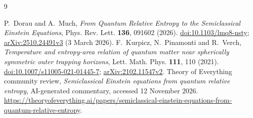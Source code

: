 \documentclass[11pt]{article}
\begin{document}
\begin{thebibliography}{9}
\raggedright
{} P.~Dorau and A.~Much,
\emph{From Quantum Relative Entropy to the Semiclassical Einstein Equations},
Phys. Rev. Lett. \textbf{136}, 091602 (2026).
\href{https://doi.org/10.1103/lmq8-nsty}{doi:10.1103/lmq8-nsty};
\href{https://arxiv.org/abs/2510.24491v3}{arXiv:2510.24491v3} (3 March 2026).
 F.~Kurpicz, N.~Pinamonti and R.~Verch,
\emph{Temperature and entropy-area relation of quantum matter near spherically symmetric outer trapping horizons},
Lett. Math. Phys. \textbf{111}, 110 (2021).
\href{https://doi.org/10.1007/s11005-021-01445-7}{doi:10.1007/s11005-021-01445-7};
\href{https://arxiv.org/abs/2102.11547v2}{arXiv:2102.11547v2}.
 Theory of Everything community review,
\emph{Semiclassical Einstein equations from quantum relative entropy},
AI-generated commentary, accessed 12 November 2026.
\url{https://theoryofeverything.ai/papers/semiclassical-einstein-equations-from-quantum-relative-entropy}.
\end{thebibliography}
\end{document}
